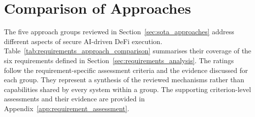 






\section{Comparison of Approaches}
\label{sec:sota_comparison}

The five approach groups reviewed in
Section~\ref{sec:sota_approaches} address different aspects
of secure AI-driven DeFi execution. Table~\ref{tab:requirements_approach_comparison}
summarises their coverage of the six requirements defined
in Section~\ref{sec:requirements_analysis}. The ratings
follow the requirement-specific assessment criteria and
the evidence discussed for each group. They represent
a synthesis of the reviewed mechanisms rather than
capabilities shared by every system within a group.
The supporting criterion-level assessments and their
evidence are provided in
Appendix~\ref{app:requirement_assessment}.

